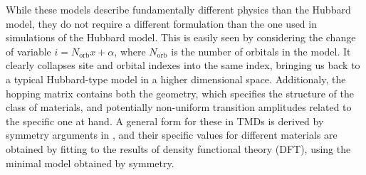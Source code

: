 While these models describe fundamentally different physics than the Hubbard model, they do not require a different formulation than the one used in simulations of the Hubbard model.
This is easily seen by considering the change of variable $i = N_{\text{orb}} x + \alpha$, where $N_{\text{orb}}$ is the number of orbitals in the model.
It clearly collapses site and orbital indexes into the same index, bringing us back to a typical Hubbard-type model in a higher dimensional space.
Additionaly, the hopping matrix contains both the geometry, which specifies the  structure of the class of materials, and potentially non-uniform transition amplitudes related to the specific one at hand.
A general form for these in \acp{TMD} is derived by symmetry arguments in \cite{liu_three-band_2013}, and their specific values for different materials are obtained by fitting to the results of  density functional theory (DFT), using the minimal model obtained by symmetry.
